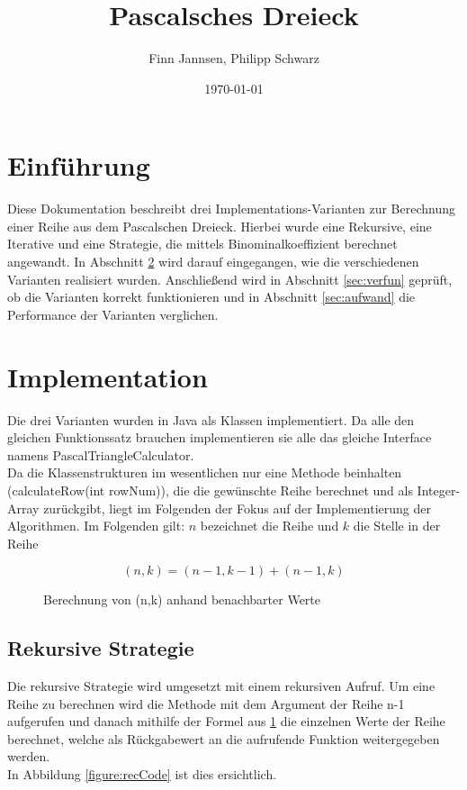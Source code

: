 \documentclass[11pt]{scrartcl}
\title{Pascalsches Dreieck}
\author{Finn Jannsen, Philipp Schwarz}
\date{\today{}}
\begin{document}
\maketitle

\tableofcontents

\section{Einführung}
	\label{sec:einfuehrung}
	
	Diese Dokumentation beschreibt drei Implementations-Varianten zur Berechnung einer Reihe aus dem Pascalschen Dreieck.
	Hierbei wurde eine Rekursive, eine Iterative und eine Strategie, die mittels Binominalkoeffizient berechnet angewandt.
	In Abschnitt \ref{sec:implementation} wird darauf eingegangen, wie die verschiedenen Varianten realisiert wurden.
	Anschließend wird in Abschnitt \ref{sec:verfun} geprüft, ob die Varianten korrekt funktionieren und in Abschnitt \ref{sec:aufwand} die Performance der Varianten verglichen.

\section{Implementation}
	\label{sec:implementation}
	
	Die drei Varianten wurden in Java als Klassen implementiert. Da alle den gleichen Funktionssatz brauchen implementieren sie alle das gleiche Interface namens PascalTriangleCalculator.\\
	Da die Klassenstrukturen im wesentlichen nur eine Methode beinhalten (calculateRow(int rowNum)), die die gewünschte Reihe berechnet und als Integer-Array zurückgibt, 
	liegt im Folgenden der Fokus auf der Implementierung der Algorithmen. Im Folgenden gilt: $n$ bezeichnet die Reihe und $k$ die Stelle in der Reihe

	\begin{figure}
	\begin{equation*}
	(n,k) = (n-1, k-1) + (n-1, k)
	\end{equation*}
	\caption{Berechnung von (n,k) anhand benachbarter Werte}
	\label{figure:pairCalc}
	\end{figure}

	\subsection{Rekursive Strategie}
		\label{sec:recStrat}
		
		Die rekursive Strategie wird umgesetzt mit einem rekursiven Aufruf. Um eine Reihe zu berechnen wird die Methode mit dem Argument der Reihe n-1 aufgerufen 
		und danach mithilfe der Formel aus \ref{figure:pairCalc} die einzelnen Werte der Reihe berechnet, welche als Rückgabewert an die aufrufende Funktion weitergegeben werden.\\
		In Abbildung \ref{figure:recCode} ist dies ersichtlich.
\end{document}
